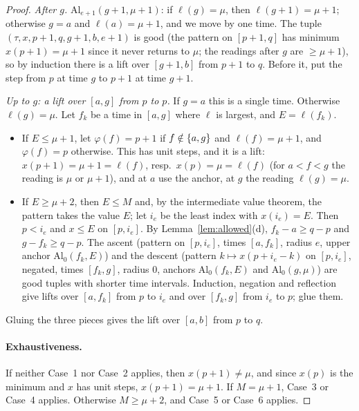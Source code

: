 \begin{proof}
\emph{After $g$.} $\mathrm{Al}_{e+1}(g+1,\mu+1)$: if $\ell(g)=\mu$, then $\ell(g+1)=\mu+1$; otherwise $g=a$ and
$\ell(a)=\mu+1$, and we move by one time. The tuple $(\tau,x,p+1,q,g+1,b,e+1)$ is good (the pattern on $[p+1,q]$ has minimum
$x(p+1)=\mu+1$ since it never returns to $\mu$; the readings after $g$ are $\ge\mu+1$), so by induction there is a lift over
$[g+1,b]$ from $p+1$ to $q$. Before it, put the step from $p$ at time $g$ to $p+1$ at time $g+1$.

\emph{Up to $g$: a lift over $[a,g]$ from $p$ to $p$.} If $g=a$ this is a single time. Otherwise $\ell(g)=\mu$. Let $f_k$
be a time in $[a,g]$ where $\ell$ is largest, and $E=\ell(f_k)$.
\begin{itemize}
\item If $E\le\mu+1$, let $\varphi(f)=p+1$ if $f\notin\left\{ a,g \right\}$ and $\ell(f)=\mu+1$, and $\varphi(f)=p$ otherwise. This has
unit steps, and it is a lift: $x(p+1)=\mu+1=\ell(f)$, resp.\ $x(p)=\mu=\ell(f)$ (for $a<f<g$ the reading is $\mu$ or $\mu+1$),
and at $a$ use the anchor, at $g$ the reading $\ell(g)=\mu$.
\item If $E\ge\mu+2$, then $E\le M$ and, by the intermediate value theorem, the pattern takes the value $E$; let $i_e$ be
the least index with $x(i_e)=E$. Then $p<i_e$ and $x\le E$ on $[p,i_e]$. By Lemma~\ref{lem:allowed}(d),
$f_k-a\ge q-p$ and $g-f_k\ge q-p$. The ascent (pattern on $[p,i_e]$, times $[a,f_k]$, radius $e$, upper anchor
$\mathrm{Al}_0(f_k,E)$) and the descent (pattern $k\mapsto x(p+i_e-k)$ on $[p,i_e]$, negated, times $[f_k,g]$, radius $0$,
anchors $\mathrm{Al}_0(f_k,E)$ and $\mathrm{Al}_0(g,\mu)$) are good tuples with shorter time intervals. Induction, negation
and reflection give lifts over $[a,f_k]$ from $p$ to $i_e$ and over $[f_k,g]$ from $i_e$ to $p$; glue them.
\end{itemize}
Gluing the three pieces gives the lift over $[a,b]$ from $p$ to $q$.

\paragraph{Exhaustiveness.} If neither Case~1 nor Case~2 applies, then $x(p+1)\ne\mu$, and since $x(p)$ is the minimum and
$x$ has unit steps, $x(p+1)=\mu+1$. If $M=\mu+1$, Case~3 or Case~4 applies. Otherwise $M\ge\mu+2$, and Case~5 or Case~6
applies.
\end{proof}


